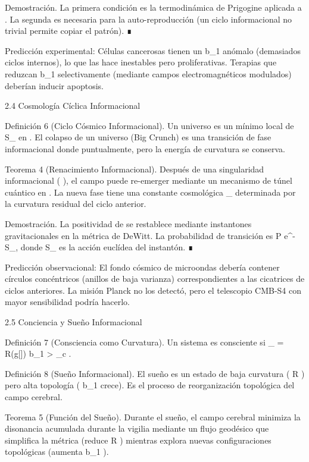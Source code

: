 \documentclass[12pt,a4paper]{book}
\begin{document}
Demostración. La primera condición es la termodinámica de Prigogine aplicada a  \rho . La segunda es necesaria para la auto-reproducción (un ciclo informacional no trivial permite copiar el patrón). ∎

Predicción experimental: Células cancerosas tienen un  b_1  anómalo (demasiados ciclos internos), lo que las hace inestables pero proliferativas. Terapias que reduzcan  b_1  selectivamente (mediante campos electromagnéticos modulados) deberían inducir apoptosis.

2.4 Cosmología Cíclica Informacional

Definición 6 (Ciclo Cósmico Informacional). Un universo es un mínimo local de  S_{}  en   . El colapso de un universo (Big Crunch) es una transición de fase informacional donde  \rho {}  puntualmente, pero la energía de curvatura se conserva.

Teorema 4 (Renacimiento Informacional). Después de una singularidad informacional ( \rho {} ), el campo  \rho  puede re-emerger mediante un mecanismo de túnel cuántico en   . La nueva fase tiene una constante cosmológica  \Lambda_{}  determinada por la curvatura residual del ciclo anterior.

Demostración. La positividad de  \rho  se restablece mediante instantones gravitacionales en la métrica de DeWitt. La probabilidad de transición es  P \propto e^{-S_{}},  donde  S_{}  es la acción euclídea del instantón. ∎

Predicción observacional: El fondo cósmico de microondas debería contener círculos concéntricos (anillos de baja varianza) correspondientes a las cicatrices de ciclos anteriores. La misión Planck no los detectó, pero el telescopio CMB-S4 con mayor sensibilidad podría hacerlo.

2.5 Conciencia y Sueño Informacional

Definición 7 (Consciencia como Curvatura). Un sistema es consciente si  \Phi_{} = R(g[\rho]) \cdot b_1 > \Phi_c .

Definición 8 (Sueño Informacional). El sueño es un estado de baja curvatura ( R  ) pero alta topología ( b_1  crece). Es el proceso de reorganización topológica del campo  \rho  cerebral.

Teorema 5 (Función del Sueño). Durante el sueño, el campo  \rho  cerebral minimiza la disonancia acumulada durante la vigilia mediante un flujo geodésico que simplifica la métrica (reduce  R ) mientras explora nuevas configuraciones topológicas (aumenta  b_1 ).
\end{document}
